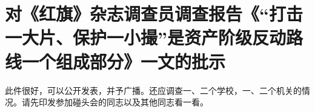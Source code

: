 \section[对《红旗》杂志调查员调查报告《“打击一大片、保护一小撮”是资产阶级反动路线一个组成部分》一文的批示（一九六七年三月二十九日）]{对《红旗》杂志调查员调查报告《“打击一大片、保护一小撮”是资产阶级反动路线一个组成部分》一文的批示}


此件很好，可以公开发表，并予广播。还应调查一、二个学校，一、二个机关的情况。请先印发参加碰头会的同志以及其他同志看一看。



